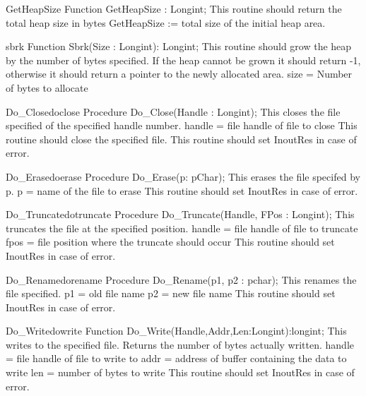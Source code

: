 \documentclass [a4paper,12pt]{article}
\begin{document}
\begin{function}{GetHeapSize}
\Declaration
Function GetHeapSize : Longint;
\Description
This routine should return the total heap size in bytes
\Algorithm
GetHeapSize := total size of the initial heap area.
\end{function}

\begin{function}{sbrk}
\Declaration
Function Sbrk(Size : Longint): Longint;
\Description
This routine should grow the heap by the number of bytes specified. If
the heap cannot be grown it should return -1, otherwise it should return
a pointer to the newly allocated area.
\Parameters
size = Number of bytes to allocate
\end{function}

\begin{procedurel}{Do{\_}Close}{doclose}
\Declaration
Procedure Do{\_}Close(Handle : Longint);
\Description
This closes the file specified of the specified handle number.
\Parameters
handle = file handle of file to close
\Notes
This routine should close the specified file.
\Notes
This routine should set InoutRes in case of error.
\end{procedurel}

\begin{procedurel}{Do{\_}Erase}{doerase}
\Declaration
Procedure Do{\_}Erase(p: pChar);
\Description
This erases the file specifed by p.
\Parameters
p = name of the file to erase
\Notes
This routine should set InoutRes in case of error.
\end{procedurel}

\begin{procedurel}{Do{\_}Truncate}{dotruncate}
\Declaration
Procedure Do{\_}Truncate(Handle, FPos : Longint);
\Description
This truncates the file at the specified position.
\Parameters
handle = file handle of file to truncate
fpos = file position where the truncate should occur
\Notes
This routine should set InoutRes in case of error.
\end{procedurel}


\begin{procedurel}{Do{\_}Rename}{dorename}
\Declaration
Procedure Do{\_}Rename(p1, p2 : pchar);
\Description
This renames the file specified.
\Parameters
p1 = old file name
p2 = new file name
\Notes
This routine should set InoutRes in case of error.
\end{procedurel}

\begin{functionl}{Do{\_}Write}{dowrite}
\Declaration
Function Do{\_}Write(Handle,Addr,Len:Longint):longint;
\Description
This writes to the specified file. Returns the number of bytes 
actually written.
\Parameters
handle = file handle of file to write to
addr = address of buffer containing the data to write
len = number of bytes to write
\Notes
This routine should set InoutRes in case of error.
\end{functionl}
\end{document}
